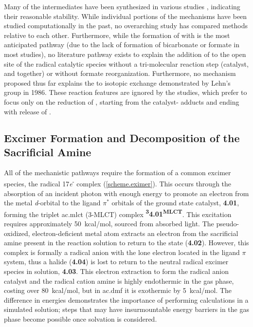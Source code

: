 Many of the intermediates have been synthesized in various studies \autocite{shaver1992, gibson1998, gibson1999, gibson2003}, indicating their reasonable stability. While individual portions of the mechanisms have been studied computationally in the past\autocite{agarwal2011, agarwal2012a, agarwal2012b}, no overarching study has compared methods relative to each other. Furthermore, while the formation of  with  is the most anticipated pathway (due to the lack of formation of bicarbonate or formate in most studies), no literature pathway exists to explain the addition of  to the open site of the radical catalytic species without a tri-molecular reaction step (catalyst,  and  together) or without formate reorganization. Furthermore, no mechanism proposed thus far explains the  to  isotopic exchange demonstrated by Lehn's group in 1986\autocite{hawecker1986}. These reaction features are ignored by the studies, which prefer to focus only on the reduction of , starting from the catalyst- adducts and ending with release of .

\subsection{Excimer Formation and Decomposition of the Sacrificial Amine}\label{ss.initiation}

All of the mechanistic pathways require the formation of a common excimer species, the radical 17\textit{e}\textsuperscript{-} complex (\autoref{scheme.eximer}). This occurs through the absorption of an incident photon with enough energy to promote an electron from the metal \textit{d}-orbital to the ligand $\pi^\ast$ orbitals of the ground state catalyst, \textbf{4.01}, forming the triplet \acrlong{ac.mlct} (3-MLCT) complex \textbf{\textsuperscript{3}4.01\textsuperscript{MLCT}}. This excitation requires approximately 50~kcal/mol, sourced from absorbed light. The pseudo-oxidized, electron-deficient metal atom extracts an electron from the sacrificial amine present in the reaction solution to return to the  state (\textbf{4.02}). However, this complex is formally a radical anion with the lone electron located in the ligand $\pi$ system, thus a halide (\textbf{4.04}) is lost to return to the neutral radical excimer species in solution, \textbf{4.03}. This electron extraction to form the radical anion catalyst and the radical cation amine is highly endothermic in the gas phase, costing over 80~kcal/mol, but in \gls{ac.dmf} it is exothermic by 5~kcal/mol. The difference in energies demonstrates the importance of performing calculations in a simulated solution; steps that may have insurmountable energy barriers in the gas phase become possible once solvation is considered.

